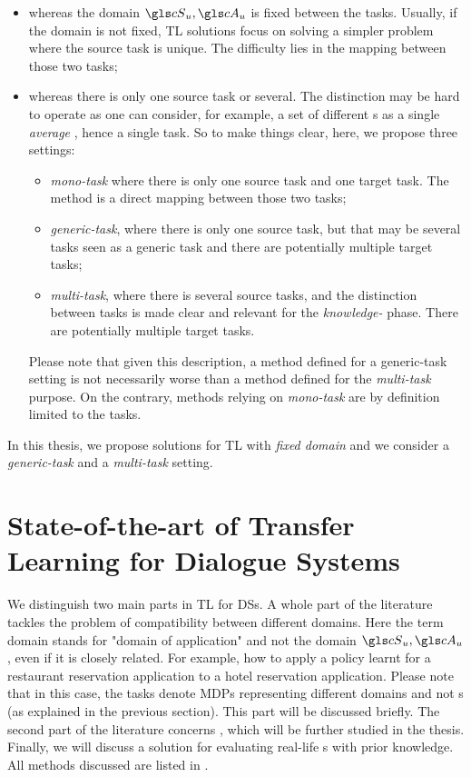 \begin{itemize}
    \item whereas the domain $\cS_{u}, \cA_{u}$ is fixed between the tasks. Usually, if the domain is not fixed, \gls{TL} solutions focus on solving a simpler problem where the source task is unique. The difficulty lies in the mapping between those two tasks;
    \item whereas there is only one source task or several. The distinction may be hard to operate as one can consider, for example, a set of different s as a single \textit{average} , hence a single task. So to make things clear, here, we propose three settings:
\begin{itemize}
        \item \textit{mono-task}  where there is only one source task and one target task. The method is a direct mapping between those two tasks;
        \item \textit{generic-task}, where there is only one source task, but that may be several tasks seen as a generic task and there are potentially multiple target tasks;
        \item \textit{multi-task}, where there is several source tasks, and the distinction between tasks is made clear and relevant for the \textit{knowledge-} phase. There are potentially multiple target tasks.
\end{itemize}
    Please note that given this description, a method defined for a generic-task setting is not necessarily worse than a method defined for the \textit{multi-task} purpose. On the contrary, methods relying on \textit{mono-task}  are by definition limited to the tasks.

\end{itemize}

In this thesis, we propose solutions for  \gls{TL} with \textit{fixed domain} and we consider a \textit{generic-task} and a \textit{multi-task} setting.

\section{State-of-the-art of Transfer Learning for Dialogue Systems}

We distinguish two main parts in \gls{TL} for \glspl{DS}. A whole part of the literature tackles the problem of compatibility between different domains. Here the term domain stands for "domain of application" and not the domain $\cS_{u}, \cA_{u}$, even if it is closely related. For example, how to apply a policy learnt for a restaurant reservation application to a hotel reservation application. Please note that in this case, the tasks denote \glspl{MDP} representing different domains and not s (as explained in the previous section). This part will be discussed briefly. The second part of the literature concerns , which will be further studied in the thesis. Finally, we will discuss a solution for evaluating real-life s with prior knowledge. All methods discussed are listed in .

